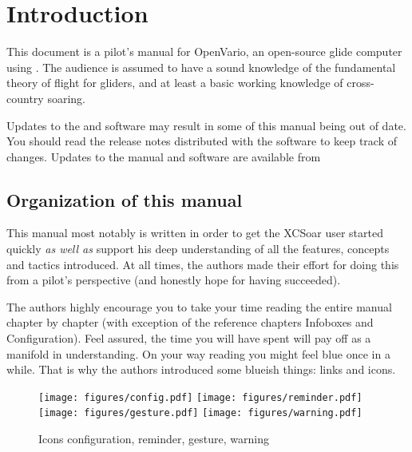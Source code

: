 \chapter{Introduction}\label{cha:introduction}
This document is a pilot's manual for OpenVario, an open-source glide
computer using \xc. The audience is assumed to have a sound knowledge 
of the fundamental theory of flight for gliders, and at least a basic
 working knowledge of cross-country soaring.

Updates to the \ovfc and \xc software may result in some of this manual being
out of date. You should read the release notes distributed with the
software to keep track of changes.  Updates to the manual and software
are available from 
\begin{quote}
\ovwebsite{}
\end{quote}

\section{Organization of this manual}

This manual most notably is written in order to get the XCSoar user started 
quickly  \emph{as well as} support his deep understanding of all the features, 
concepts and tactics introduced. At all times, the authors made their effort 
for doing this from a pilot's perspective (and honestly hope for having 
succeeded).

The authors highly encourage you to take your time reading the entire manual 
chapter by chapter (with exception of the reference chapters Infoboxes and 
Configuration). Feel assured, the time you will have spent will pay off as a 
manifold in understanding. On your way reading you might feel blue once in a 
while. That is why the authors introduced some blueish things: links and 
icons.

\begin{figure}[h]
\centering
\texttt{[image: figures/config.pdf]}
\hspace{1.5cm}
\texttt{[image: figures/reminder.pdf]}
\hspace{1.5cm}
\texttt{[image: figures/gesture.pdf]}
\hspace{1.5cm}
\texttt{[image: figures/warning.pdf]}
\caption{Icons configuration, reminder, gesture, warning}
\end{figure}

